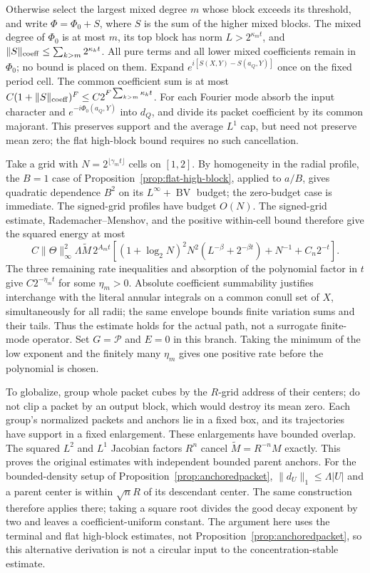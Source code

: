 \documentclass[11pt]{article}
\numberwithin{equation}{section}
\theoremstyle{remark}
\theoremstyle{definition}
\newcommand{\BV}{\operatorname{BV}}
\begin{document}
Otherwise select the largest mixed degree $m$ whose block exceeds its
threshold, and write $\Phi=\Phi_0+S$, where $S$ is the sum of the
higher mixed blocks.  The mixed degree of $\Phi_0$ is at most $m$,
its top block has norm $L>2^{\kappa_m t}$, and
$\|S\|_{\rm coeff}\le\sum_{k>m}2^{\kappa_k t}$.
All pure terms and all lower mixed coefficients remain in $\Phi_0$;
no bound is placed on them.  Expand
$e^{i[S(X,Y)-S(a_Q,Y)]}$ once on the fixed period cell.
The common coefficient sum is at most
$C(1+\|S\|_{\rm coeff})^F\le C2^{F\sum_{k>m}\kappa_k t}$.
For each Fourier mode absorb the input character and
$e^{-i\Phi_0(a_Q,Y)}$ into $d_Q$, and divide its packet coefficient
by its common majorant.  This preserves support and the average
$L^1$ cap, but need not preserve mean zero; the flat high-block bound
requires no such cancellation.

Take a grid with $N=2^{\lfloor\gamma_m t\rfloor}$ cells on $[1,2]$.
By homogeneity in the radial profile, the $B=1$ case of
Proposition~\ref{prop:flat-high-block}, applied to $a/B$, gives quadratic
dependence $B^2$ on its $L^\infty+\BV$ budget; the zero-budget case is
immediate. The signed-grid profiles have budget $O(N)$.
The signed-grid estimate, Rademacher--Menshov, and the positive
within-cell bound therefore give the squared energy at most
\[
 C\|\Theta\|_\infty^2\Lambda\widetilde M\,
 2^{A_m t}
 \left[(1+\log_2N)^2N^2(L^{-\beta}+2^{-\beta t})
                    +N^{-1}+C_n2^{-t}\right].
\]
The three remaining rate inequalities and absorption of the polynomial
factor in $t$ give $C2^{-\eta_m t}$ for some $\eta_m>0$.
Absolute coefficient summability justifies interchange with the
literal annular integrals on a common conull set of $X$, simultaneously
for all radii; the same envelope bounds finite variation
sums and their tails.  Thus the estimate holds for the actual path,
not a surrogate finite-mode operator.  Set $G=\mathcal P$ and $E=0$
in this branch.  Taking the minimum of the low exponent and the finitely
many $\eta_m$ gives one positive rate before the polynomial is chosen.

To globalize, group whole packet cubes by the $R$-grid address of their
centers; do not clip a packet by an output block, which would destroy
its mean zero.  Each group's normalized packets and anchors lie in a
fixed box, and its trajectories have support in a fixed enlargement.
These enlargements have bounded overlap.  The squared $L^2$ and $L^1$
Jacobian factors $R^n$ cancel $\widetilde M=R^{-n}M$ exactly.
This proves the original estimates with independent bounded parent
anchors.  For the bounded-density setup of
Proposition~\ref{prop:anchoredpacket},
$\|d_U\|_1\le\Lambda|U|$ and a parent center is within
$\sqrt n R$ of its descendant center.  The same construction therefore
applies there; taking a square root divides the good decay exponent by
two and leaves a coefficient-uniform constant.
The argument here uses the terminal and flat high-block estimates, not
Proposition~\ref{prop:anchoredpacket}, so this alternative derivation is
not a circular input to the concentration-stable estimate.
\end{document}
